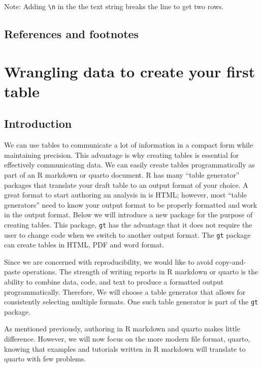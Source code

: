 \documentclass[
  11pt,
  letterpaper,
]{scrbook}
\begin{document}
Note: Adding \texttt{\textbackslash{}n} in the the text string breaks
the line to get two rows.

\hypertarget{references-and-footnotes-3}{%
\section{References and footnotes}\label{references-and-footnotes-3}}


\hypertarget{wrangling-data-to-create-your-first-table}{%
\chapter{Wrangling data to create your first
table}\label{wrangling-data-to-create-your-first-table}}

\hypertarget{introduction-1}{%
\section{Introduction}\label{introduction-1}}

We can use tables to communicate a lot of information in a compact form
while maintaining precision. This advantage is why creating tables is
essential for effectively communicating data. We can easily create
tables programmatically as part of an R markdown or quarto document. R
has many ``table generator'' packages that translate your draft table to
an output format of your choice. A great format to start authoring an
analysis in is HTML; however, most ``table generators'' need to know
your output format to be properly formatted and work in the output
format. Below we will introduce a new package for the purpose of
creating tables. This package, \texttt{gt} has the advantage that it
does not require the user to change code when we switch to another
output format. The \texttt{gt} package can create tables in HTML, PDF
and word format.

Since we are concerned with reproducibility, we would like to avoid
copy-and-paste operations. The strength of writing reports in R markdown
or quarto is the ability to combine data, code, and text to produce a
formatted output programmatically. Therefore, We will choose a table
generator that allows for consistently selecting multiple formats. One
such table generator is part of the \texttt{gt} package.

As mentioned previously, authoring in R markdown and quarto makes little
difference. However, we will now focus on the more modern file format,
quarto, knowing that examples and tutorials written in R markdown will
translate to quarto with few problems.
\end{document}
